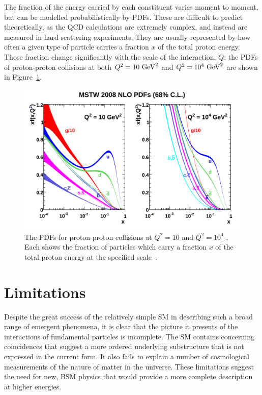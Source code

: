 The fraction of the energy carried by each constituent varies moment to moment, but can be modelled probabilistically by \acp{PDF}.
These are difficult to predict theoretically, as the \ac{QCD} calculations are extremely complex, and instead are measured in hard-scattering experiments.
They are usually represented by how often a given type of particle carries a fraction $x$ of the total proton energy.
Those fraction change significantly with the scale of the interaction, $Q$; the \acp{PDF} of proton-proton collisions at both $Q^2 = 10\ \mathrm{Ge\kern -0.05em V}^{2}$ and $Q^2 = 10^4\ \mathrm{Ge\kern -0.05em V}^{2}$ are shown in Figure~\ref{fig:pdfs}.

\begin{figure}
\includegraphics[width=\fullfig]{figures/pdfs.png}
\caption{The \acp{PDF} for proton-proton collisions at $Q^2 = 10$ \GeV{} and $Q^2 = 10^4$ \GeV{}. Each shows the fraction of particles which carry a fraction $x$ of the total proton energy at the specified scale~\cite{pdfs}.}
\label{fig:pdfs}
\end{figure}


\section{Limitations}
\label{sec:limitations}

Despite the great success of the relatively simple \ac{SM} in describing such a broad range of emergent phenomena, it is clear that the picture it presents of the interactions of fundamental particles is incomplete.
The \ac{SM} contains concerning coincidences that suggest a more ordered underlying substructure that is not expressed in the current form.
It also fails to explain a number of cosmological measurements of the nature of matter in the universe.
These limitations suggest the need for new, \ac{BSM} physics that would provide a more complete description at higher energies.


